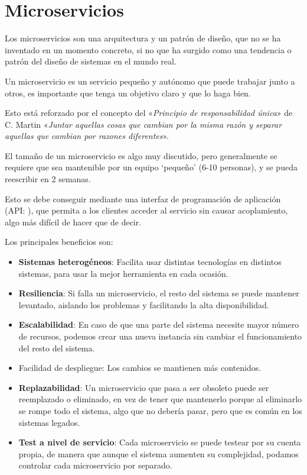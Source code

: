 \section{Microservicios}

Los microservicios son una arquitectura y un patrón de diseño, que no se ha inventado en un momento concreto, si no que ha surgido como una tendencia o patrón del diseño de sistemas en el mundo real. 

Un microservicio es un servicio pequeño y autónomo que puede trabajar junto a otros, es importante que tenga un objetivo claro y que lo haga bien.

Esto está reforzado por el concepto del «\emph{Principio de responsabilidad única}» de C. Martin\cite{martin03} «\emph{Juntar aquellas cosas que cambian por la misma razón y separar aquellas que cambian por razones diferentes}».

El tamaño de un microservicio es algo muy discutido, pero generalmente se requiere que sea mantenible por un equipo `pequeño' (6-10 personas), y se pueda reescribir en 2 semanas.

Esto se debe conseguir mediante una interfaz de programación de aplicación (API: ), que permita a los clientes acceder al servicio sin causar acoplamiento, algo más difícil de hacer que de decir.

Los principales beneficios son:
\begin{itemize}
\item \textbf{Sistemas heterogéneos}: Facilita usar distintas tecnologías en distintos sistemas, para usar la mejor herramienta en cada ocasión.
\item \textbf{Resiliencia}: Si falla un microservicio, el resto del sistema se puede mantener levantado, aislando los problemas y facilitando la alta disponibilidad.
\item \textbf{Escalabilidad}: En caso de que una parte del sistema necesite mayor número de recursos, podemos crear una nueva instancia sin cambiar el funcionamiento del resto del sistema.
\item Facilidad de despliegue: Los cambios se mantienen más contenidos.
\item \textbf{Replazabilidad}: Un microservicio que pasa a ser obsoleto puede ser reemplazado o eliminado, en vez de tener que mantenerlo porque al eliminarlo se rompe todo el sistema, algo que no debería pasar, pero que es común en los sistemas legados.
\item \textbf{Test a nivel de servicio}: Cada microservicio se puede testear por su cuenta propia, de manera que aunque el sistema aumenten su complejidad, podamos controlar cada microservicio por separado.
\end{itemize}

